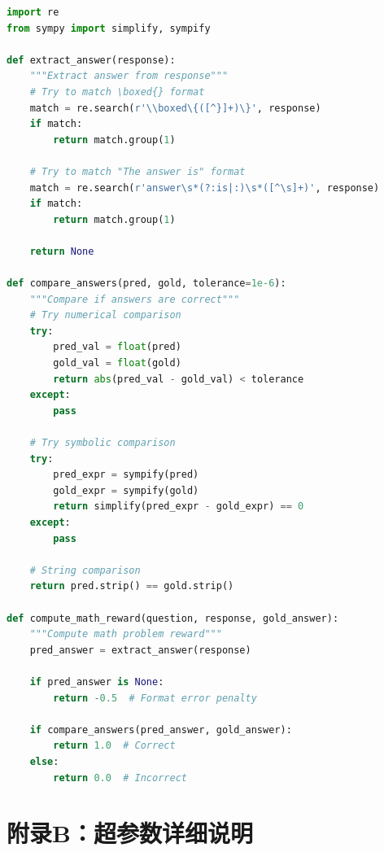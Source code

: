 \documentclass[12pt,a4paper]{article}
\begin{document}
\begin{lstlisting}[language=Python, caption=Math Problem Reward Function]
import re
from sympy import simplify, sympify

def extract_answer(response):
    """Extract answer from response"""
    # Try to match \boxed{} format
    match = re.search(r'\\boxed\{([^}]+)\}', response)
    if match:
        return match.group(1)
    
    # Try to match "The answer is" format
    match = re.search(r'answer\s*(?:is|:)\s*([^\s]+)', response)
    if match:
        return match.group(1)
    
    return None

def compare_answers(pred, gold, tolerance=1e-6):
    """Compare if answers are correct"""
    # Try numerical comparison
    try:
        pred_val = float(pred)
        gold_val = float(gold)
        return abs(pred_val - gold_val) < tolerance
    except:
        pass
    
    # Try symbolic comparison
    try:
        pred_expr = sympify(pred)
        gold_expr = sympify(gold)
        return simplify(pred_expr - gold_expr) == 0
    except:
        pass
    
    # String comparison
    return pred.strip() == gold.strip()

def compute_math_reward(question, response, gold_answer):
    """Compute math problem reward"""
    pred_answer = extract_answer(response)
    
    if pred_answer is None:
        return -0.5  # Format error penalty
    
    if compare_answers(pred_answer, gold_answer):
        return 1.0  # Correct
    else:
        return 0.0  # Incorrect
\end{lstlisting}

\section*{附录B：超参数详细说明}
\end{document}
